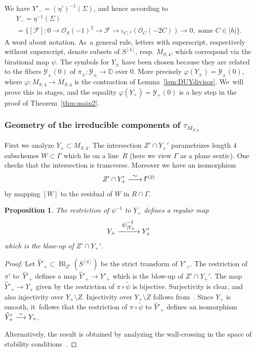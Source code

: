 \documentclass[JEP,XML,SOM,Unicode,published]{cedram}
\newcommand\To[1]{\mathchoice{\xrightarrow{\textstyle\kern4pt#1\kern3pt}}{\stackrel{#1}{\longrightarrow}}{}{}}
\let\raw\rightarrow
\newcommand{\DD}{{\mathbb D}}
\newcommand\cF{\mathcal{F}}
\newcommand\cO{\mathcal{O}}
\newcommand\cY{\mathcal{Y}}
\DeclareMathOperator{\Bl}{Bl}
\let\ov\overline
\let\phi\varphi
\let\wh\widehat
\let\wt\widetilde
\newtheorem{prop}[lemm]{Proposition}
\theoremstyle{definition}
\begin{document}
We have $Y'_{-}=(\eta')^{-1}(\Sigma)$, and hence according to~\cite[Prop.\,5.1]{involutions1}
\begin{multline}\label{eccoymeno}
Y_{-}=\eta^{-1}(\Sigma)\\
=\{[\cF] :0\raw \cO_S(-1)^{ 2}\raw \cF\raw \iota_{C,*}(\cO_C(-2C))\raw 0,\; \text{some $C\in|h|$} \}.
\end{multline}
A word about notation. As~a general rule, letters with superscript, respectively without superscript, denote subsets of $S^{[4]}$, resp. $M_{S,4}$, which correspond via the birational map $\psi$. The symbols for $Y_{\pm}$ have been chosen because they are related to the fibers $\cY_{\pm}(0)$ of $\pi_{\pm}\colon \cY_{\pm}\to\DD$ over $0$.
More precisely $\varphi(Y_{\pm})=\cY_{\pm}(0)$, where $\phi\colon M_{S,4}\to\ov{M}_{S,4}$ is the contraction of Lemma~\ref{lem:DUYdivisor}. We~will prove this in stages, and the equality $\varphi(Y_{+})=\cY_{+}(0)$ is a key step in the proof of Theorem~\ref{thm:main2}.

\subsubsection*{Geometry of the irreducible components of $\tau_{M_{S,4}}$}
First we analyze $Y_{+}\subset M_{S,4}$. The intersection $Z'\cap Y_+'$ parametrizes length $4$ subschemes $W\subset\mathsf{\Gamma}$ which lie on a line~$R$ (here we view $\mathsf{\Gamma}$ as a plane sextic).
One checks that the intersection is transverse. Moreover we have an isomorphism
\begin{equation*}
Z'\cap Y_+' \To{\sim} \mathsf{\Gamma}^{(2)}
\end{equation*}
by mapping $[W]$ to the residual of $W$ in
$R\cap\mathsf{\Gamma}$.

\begin{prop}\label{prop:ipspiublow}
The restriction of $\psi^{-1}$ to $Y_{+}$ defines a regular map
\begin{equation*}
Y_{+}\To{\psi^{-1}_{|Y_{+}}} Y'_{+}
\end{equation*}
which is the blow-up of $Z'\cap Y_+'$.
\end{prop}

\begin{proof}
Let $\wh{Y}'_{+}\subset\Bl_{Z'}(S^{[4]})$ be the strict transform of $Y'_{+}$. The restriction of $\pi'$ to~$\wh{Y}'_{+}$ defines a map $\wh{Y}'_{+}\to Y'_{+}$ which is the blow-up of $Z'\cap Y_+'$. The map
$\wh{Y}'_{+}\to Y_{+}$ given by the restriction of $\pi\circ\wt{\psi}$ is bijective.
Surjectivity is clear, and also injectivity over $Y_{+}\setminus Z$. Injectivity over $Y_{+}\setminus Z$ follows from~\cite[Prop.\,5.2]{involutions1}. Since $Y_{+}$ is smooth, it~follows that the restriction of $\pi\circ\wt{\psi}$ to $\wh{Y}'_{+}$ defines an isomorphism $\wh{Y}'_{+}\To{\sim} Y_{+}$.

Alternatively, the result is obtained by analyzing the wall-crossing in the space of stability conditions~\cite[\S 9]{BM:walls}.
\end{proof}
\end{document}
